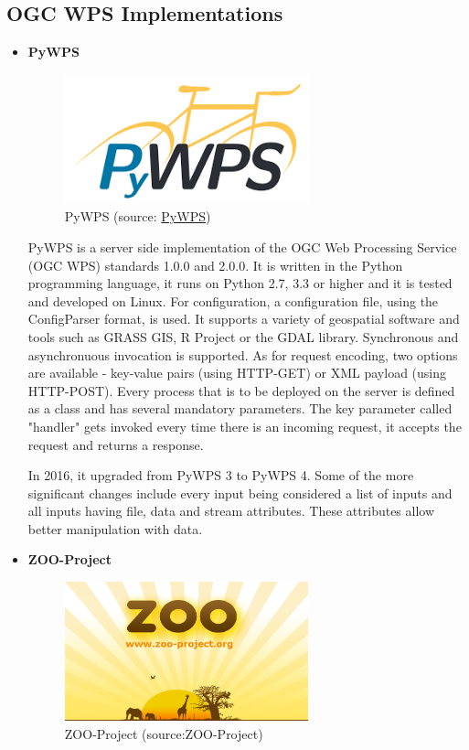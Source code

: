 \subsection{OGC WPS Implementations}




\begin{itemize}
\item \textbf{PyWPS}

\begin{figure}[H] \centering
      \includegraphics[width=200pt]{./pictures/pywps.png}
      \caption[PyWPS logo]{PyWPS (source:
\href{http://pywps.org/images/pywps.png}{PyWPS})}
      \label{fig:PyWPS}
  \end{figure}

PyWPS is a server side implementation of the OGC Web Processing Service (OGC WPS) standards 1.0.0 and 2.0.0. It is written in the Python programming language, it runs on Python 2.7, 3.3 or higher and it is tested and developed on Linux. For configuration, a configuration file, using the ConfigParser format, is used. It supports a variety of geospatial software and tools such as GRASS GIS, R Project or the GDAL library.  Synchronous and asynchronuous invocation is supported. As for request encoding, two options are available - key-value pairs (using HTTP-GET) or XML payload (using HTTP-POST). Every process that is to be deployed on the server is defined as a class and has several mandatory parameters. The key parameter called "handler" gets invoked every time there is an incoming request, it accepts the request and returns a response. 


In 2016, it upgraded from PyWPS 3 to PyWPS 4. Some of the more significant changes include every input being considered a list of inputs and all inputs having file, data and stream attributes. These attributes allow better manipulation with data. 
	
  
	

  


\item \textbf{ZOO-Project}

\begin{figure}[H] \centering
      \includegraphics[width=200pt]{./pictures/zoo.png}
      \caption[ZOO-Project logo]{ZOO-Project (source:ZOO-Project)}
      \label{fig:ZOO-Project}
  \end{figure}


\end{itemize}
